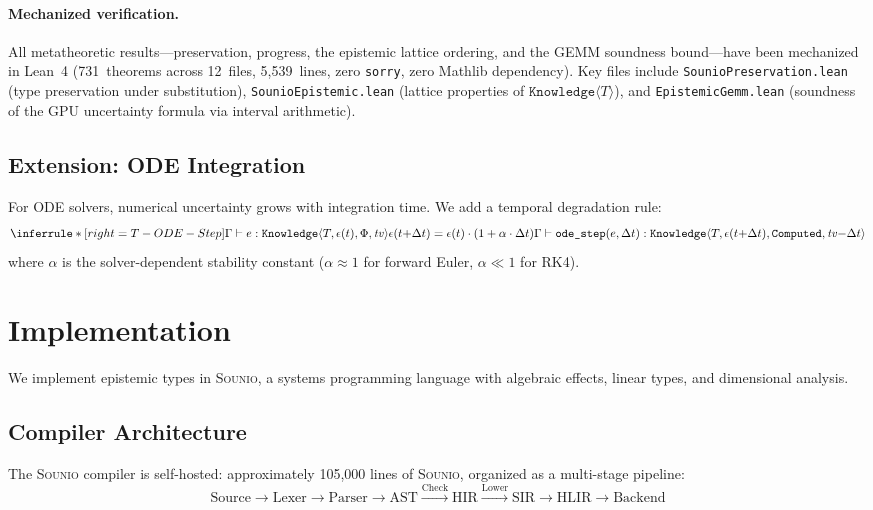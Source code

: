 \documentclass[acmsmall,screen,review,anonymous]{acmart}
\newcommand{\sounio}{\textsc{Sounio}\xspace}
\newcommand{\knowfull}[4]{\texttt{Knowledge}\langle #1, #2, #3, #4 \rangle}
\newcommand{\eps}{\epsilon}
\begin{document}
\paragraph{Mechanized verification.}
All metatheoretic results---preservation, progress, the epistemic
lattice ordering, and the GEMM soundness bound---have been mechanized
in Lean~4 (731~theorems across 12~files, 5{,}539~lines, zero
\texttt{sorry}, zero Mathlib dependency).  Key files include
\texttt{SounioPreservation.lean} (type preservation under substitution),
\texttt{SounioEpistemic.lean} (lattice properties of
$\texttt{Knowledge}\langle T\rangle$), and
\texttt{EpistemicGemm.lean} (soundness of the GPU uncertainty formula
via interval arithmetic).

\subsection{Extension: ODE Integration}

For ODE solvers, numerical uncertainty grows with integration time.
We add a temporal degradation rule:
\[
\inferrule*[right=T-ODE-Step]
  {\Gamma \vdash e : \knowfull{T}{\eps(t)}{\Phi}{\mathit{tv}} \\
   \eps(t{+}\Delta t) = \eps(t) \cdot (1 + \alpha \cdot \Delta t)}
  {\Gamma \vdash \texttt{ode\_step}(e, \Delta t) :
   \knowfull{T}{\eps(t{+}\Delta t)}{\texttt{Computed}}{\mathit{tv}{-}\Delta t}}
\]
where $\alpha$ is the solver-dependent stability constant
($\alpha \approx 1$ for forward Euler, $\alpha \ll 1$ for RK4).

\section{Implementation}
\label{sec:implementation}

We implement epistemic types in \sounio, a systems programming language
with algebraic effects, linear types, and dimensional analysis.

\subsection{Compiler Architecture}

The \sounio compiler is self-hosted: approximately 105{,}000 lines of \sounio,
organized as a multi-stage pipeline:
\[
\text{Source} \to \text{Lexer} \to \text{Parser} \to \text{AST}
\xrightarrow{\text{Check}} \text{HIR}
\xrightarrow{\text{Lower}} \text{SIR}
\to \text{HLIR} \to \text{Backend}
\]
\end{document}
